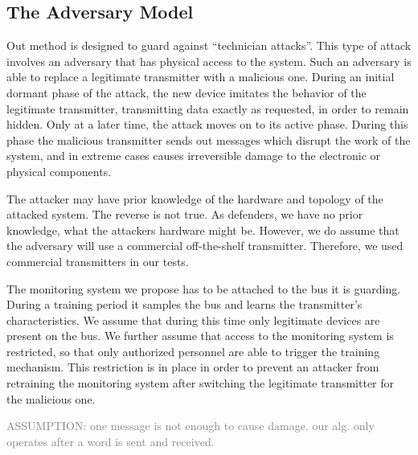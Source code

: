 \documentclass[conference]{IEEEtran}
\begin{document}
\subsection{The Adversary Model}
  Out method is designed to guard against ``technician attacks''. This type of attack involves an adversary that has physical access to the system. Such an adversary is able to replace a legitimate transmitter with a malicious one. During an initial dormant phase of the attack, the new device imitates the behavior of the legitimate transmitter, transmitting data exactly as requested, in order to remain hidden. Only at a later time, the attack moves on to its active phase. During this phase the malicious transmitter sends out messages which disrupt the work of the system, and in extreme cases causes irreversible damage to the electronic or physical components.
  

  The attacker may have prior knowledge of the hardware and topology of the attacked system. The reverse is not true. As defenders, we have no prior knowledge, what the attackers hardware might be. However, we do assume that the adversary will use a commercial off-the-shelf transmitter. Therefore, we used commercial transmitters in our tests.

  The monitoring system we propose has to be attached to the bus it is guarding. During a training period it samples the bus and learns the transmitter's characteristics. We assume that during this time only legitimate devices are present on the bus. We further assume that access to the monitoring system is restricted, so that only authorized personnel are able to trigger the training mechanism. This restriction is in place in order to prevent an attacker from retraining the monitoring system after switching the legitimate transmitter for the malicious one. 
  
  \textcolor{gray}{ASSUMPTION: one message is not enough to cause damage. our alg. only operates after a word is sent and received.}
\end{document}
